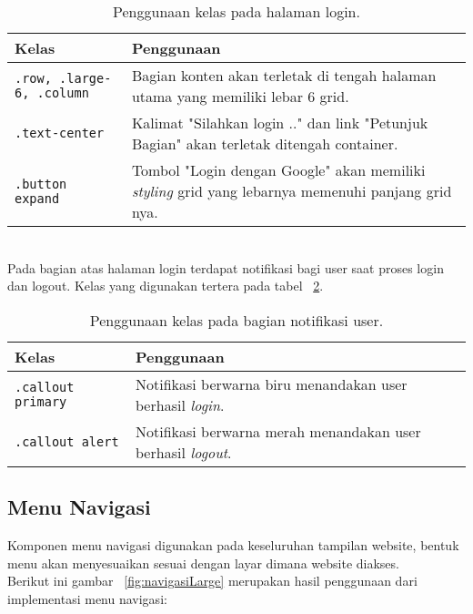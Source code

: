 \begin{table}[H]
	\centering
	\caption{Penggunaan kelas pada halaman login.}
	\begin{tabularx}{\textwidth}{lX}
		\toprule
		Kelas     & Penggunaan \\
		\midrule
		\texttt{.row, .large-6, .column} & Bagian konten akan terletak di tengah halaman utama yang memiliki lebar 6 grid.  \\
 		\texttt{.text-center} & Kalimat "Silahkan login .." dan link "Petunjuk Bagian" akan terletak ditengah container.\\
		\texttt{.button expand} & Tombol "Login dengan Google" akan memiliki \textit{styling} grid yang lebarnya memenuhi panjang grid nya.\\
		\bottomrule
	\end{tabularx}%
	\label{table:analisisLogin}
\end{table} \noindent \\

\noindent Pada bagian atas halaman login terdapat notifikasi bagi user saat proses login dan logout. Kelas yang digunakan tertera pada tabel ~\ref{table:notifikasiUser}.\\

\begin{table}[H]
	\centering
	\caption{Penggunaan kelas pada bagian notifikasi user.}
	\begin{tabularx}{\textwidth}{lX}
		\toprule
		Kelas     & Penggunaan \\
		\midrule
		\texttt{.callout primary} & Notifikasi berwarna biru menandakan user berhasil \textit{login}.\\
		\texttt{.callout alert} & Notifikasi berwarna merah menandakan user berhasil \textit{logout}.\\
		\bottomrule
	\end{tabularx}%
	\label{table:notifikasiUser}
\end{table}%


\subsection{Menu Navigasi}
Komponen menu navigasi digunakan pada keseluruhan tampilan website, bentuk menu akan menyesuaikan sesuai dengan layar dimana website diakses. \\
Berikut ini gambar ~\ref{fig:navigasiLarge} merupakan hasil penggunaan dari implementasi menu navigasi:

